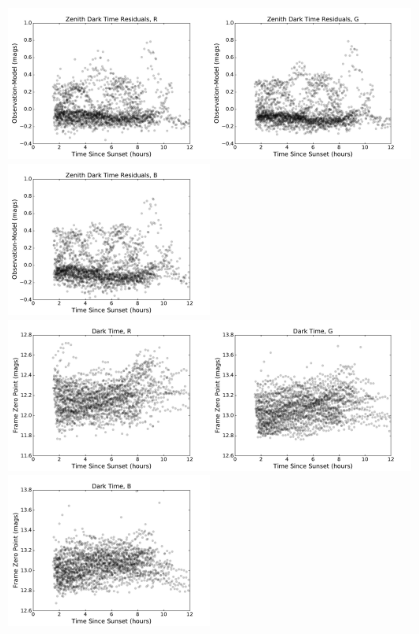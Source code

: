 \documentclass[]{spie}
\begin{document}
\begin{figure}[ht]
  \begin{center}
  \includegraphics[height=4cm]{plots/residTON_R.pdf}\includegraphics[height=4cm]{plots/residTON_G.pdf}\includegraphics[height=4cm]{plots/residTON_B.pdf} \\
  \includegraphics[height=4cm]{plots/zpTON_R.pdf}\includegraphics[height=4cm]{plots/zpTON_G.pdf}\includegraphics[height=4cm]{plots/zpTON_B.pdf}

\end{center}
\end{figure}
\end{document}
